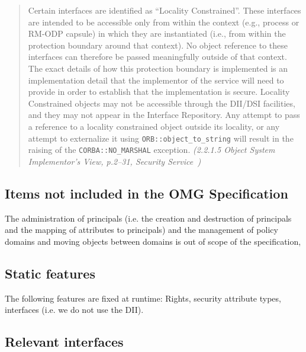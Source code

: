 \begin{quote}
  Certain interfaces are identified as ``Locality Constrained''. These
  interfaces are intended to be accessible only from within the context (e.g.,
  process or RM-ODP capsule) in which they are instantiated (i.e., from within
  the protection boundary around that context). No object reference to these
  interfaces can therefore be passed meaningfully outside of that context. The
  exact details of how this protection boundary is implemented is an
  implementation detail that the implementor of the service will need to provide
  in order to establish that the implementation is secure. Locality Constrained
  objects may not be accessible through the DII/DSI facilities, and they may not
  appear in the Interface Repository. Any attempt to pass a reference to a
  locality constrained object outside its locality, or any attempt to
  externalize it using \texttt{ORB::object\_to\_string} will result in the
  raising of the \texttt{CORBA::NO\_MARSHAL} exception.  \hspace{3ex}
  \emph{(2.2.1.5 Object System Implementor's View, p.2--31, Security
    Service~\cite{omg:Security:1.5:2000})}
\end{quote}


\subsection{Items not included in the OMG Specification}
\label{sec:not-included}

The administration of principals (i.e. the creation and destruction of
principals and the mapping of attributes to principals) and the management of
policy domains and moving objects between domains is out of scope of the
specification,


\subsection{Static features}

The following features are fixed at runtime: Rights, security attribute types,
interfaces (i.e. we do not use the DII).



\subsection{Relevant interfaces}


